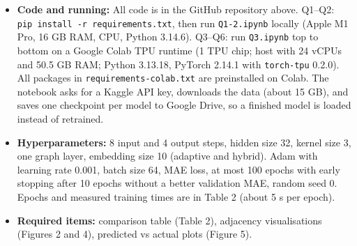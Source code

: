 
\begin{itemize}
    \item \textbf{Code and running:} All code is in the GitHub repository above. Q1--Q2: \texttt{pip install -r requirements.txt}, then run \texttt{Q1-2.ipynb} locally (Apple M1 Pro, 16 GB RAM, CPU, Python 3.14.6). Q3--Q6: run \texttt{Q3.ipynb} top to bottom on a Google Colab TPU runtime (1 TPU chip; host with 24 vCPUs and 50.5 GB RAM; Python 3.13.18, PyTorch 2.14.1 with \texttt{torch-tpu} 0.2.0). All packages in \texttt{requirements-colab.txt} are preinstalled on Colab. The notebook asks for a Kaggle API key, downloads the data (about 15 GB), and saves one checkpoint per model to Google Drive, so a finished model is loaded instead of retrained.
    \item \textbf{Hyperparameters:} 8 input and 4 output steps, hidden size 32, kernel size 3, one graph layer, embedding size 10 (adaptive and hybrid). Adam with learning rate 0.001, batch size 64, MAE loss, at most 100 epochs with early stopping after 10 epochs without a better validation MAE, random seed 0. Epochs and measured training times are in Table 2 (about 5 s per epoch).
    \item \textbf{Required items:} comparison table (Table 2), adjacency visualisations (Figures 2 and 4), predicted vs actual plots (Figure 5).
\end{itemize}
